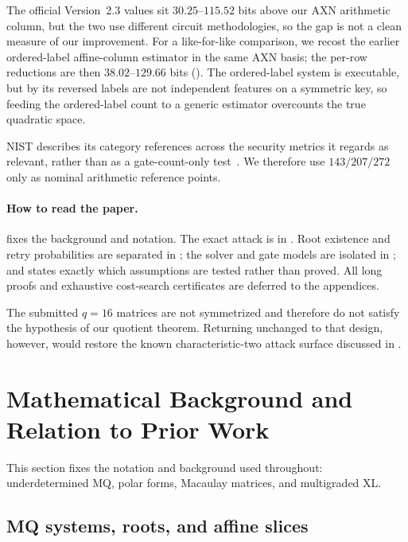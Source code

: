 \documentclass[11pt]{article}
\begin{document}
The official Version~2.3 values sit $30.25$--$115.52$ bits above our AXN
arithmetic column, but the two use different circuit methodologies, so the gap
is not a clean measure of our improvement.  For a like-for-like comparison, we
recost the earlier ordered-label affine-column estimator in the same AXN basis;
the per-row reductions are then $38.02$--$129.66$ bits
().  The ordered-label system is executable, but by
 its reversed labels are not independent features on
a symmetric key, so feeding the ordered-label count to a generic estimator
overcounts the true quadratic space.

NIST describes its category references across the security metrics it regards
as relevant, rather than as a gate-count-only test~\cite{NISTPQCCriteria}.  We
therefore use $143/207/272$ only as nominal arithmetic reference points.

\paragraph{How to read the paper.}
 fixes the background and notation.  The exact attack is
in .  Root existence and
retry probabilities are separated in ; the solver and gate
models are isolated in ; and
 states exactly which assumptions are tested rather than
proved.  All long proofs and exhaustive cost-search certificates are deferred
to the appendices.

The submitted $q=16$ matrices are not symmetrized and therefore do not satisfy
the hypothesis of our quotient theorem.  Returning unchanged to that design,
however, would restore the known characteristic-two attack surface discussed
in .

\section{Mathematical Background and Relation to Prior Work}\label{sec:mq-background}

This section fixes the notation and background used throughout: underdetermined
MQ, polar forms, Macaulay matrices, and multigraded XL.

\subsection{MQ systems, roots, and affine slices}\label{sec:mq-primer}
\end{document}

